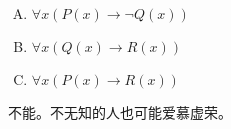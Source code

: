 {{        %
        \begin{practices}
            \begin{enumerate}[A.]
                \item $\forall x (P(x) \rightarrow \neg Q(x))$
                \item $\forall x (Q(x) \rightarrow R(x))$
                \item $\forall x (P(x) \rightarrow R(x))$
            \end{enumerate}

            不能。不无知的人也可能爱慕虚荣。
        \end{practices}
    }
}
